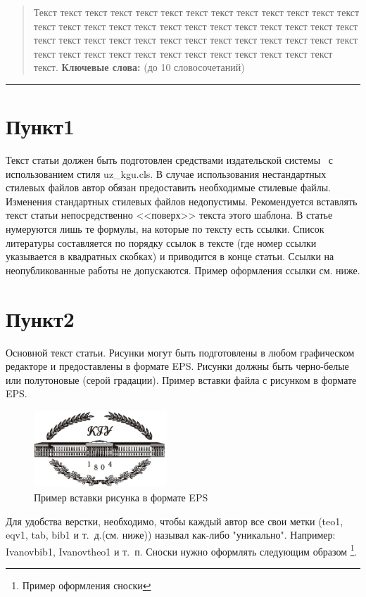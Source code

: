 \documentclass[10pt,twoside]{uz_kgu}
\begin{document}
\renewcommand{\refname}{\small {Литература}} \renewcommand{\abstractname}{Аннотация} \renewcommand{\figurename}{Рис.}
\renewcommand{\proofname}{ {\hskip\parindent \bf Доказательство. }}
\makeabstitle
\begin{abstract}
Текст текст текст текст текст текст текст текст текст текст текст текст текст текст текст текст текст текст текст текст текст текст текст текст текст текст текст текст текст текст текст текст текст текст текст текст текст текст текст текст текст текст текст текст текст текст текст текст текст текст текст текст.
\vspace{3pt}
\textbf{Ключевые слова:} (до 10 словосочетаний)
\end{abstract}
\vspace{\baselineskip}\hrule
\section{Пункт1}
Текст статьи должен быть подготовлен средствами издательской системы \LaTeXe \ с использованием стиля  uz\_kgu.cls. В случае использования нестандартных стилевых файлов автор обязан предоставить необходимые стилевые файлы. Изменения стандартных стилевых файлов недопустимы.
Рекомендуется вставлять текст статьи непосредственно <<поверх>> текста этого шаблона.
В статье нумеруются лишь те формулы, на которые по тексту есть ссылки.
Список литературы составляется по порядку ссылок в тексте (где номер ссылки указывается в квадратных скобках) и приводится в конце статьи. Ссылки на неопубликованные работы не допускаются. Пример оформления ссылки см. ниже.
\section{Пункт2}

Основной текст статьи.
Рисунки могут быть подготовлены в любом графическом редакторе и предоставлены в формате EPS. Рисунки должны быть черно-белые или полутоновые (серой градации).
 Пример вставки файла с рисунком в формате EPS.
%
\begin{figure}[!tbh]
	\centering
	\includegraphics[clip,width=50mm]{fig.eps}
\caption{Пример вставки рисунка в формате EPS}\label{tempvoid1}
\end{figure}
Для удобства верстки, необходимо, чтобы каждый автор все свои метки ({teo1}, {eqv1}, {tab}, {bib1} и т.~д.(см. ниже)) называл как-либо "уникально". Например: {Ivanovbib1}, {Ivanovtheo1} и т.~п.
Сноски нужно оформлять следующим образом \footnote{Пример оформления сноски}.
\end{document}
